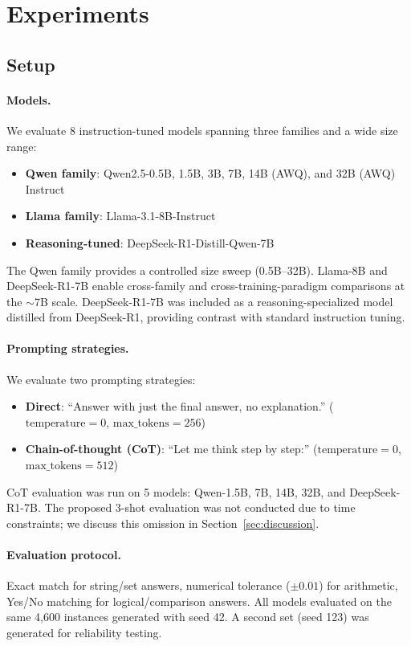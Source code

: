 \documentclass{article}
\begin{document}
\section{Experiments}
\label{sec:experiments}

\subsection{Setup}

\paragraph{Models.} We evaluate 8 instruction-tuned models spanning three families and a wide size range:
\begin{itemize}
    \item \textbf{Qwen family}: Qwen2.5-0.5B, 1.5B, 3B, 7B, 14B (AWQ), and 32B (AWQ) Instruct
    \item \textbf{Llama family}: Llama-3.1-8B-Instruct
    \item \textbf{Reasoning-tuned}: DeepSeek-R1-Distill-Qwen-7B
\end{itemize}
The Qwen family provides a controlled size sweep (0.5B--32B). Llama-8B and DeepSeek-R1-7B enable cross-family and cross-training-paradigm comparisons at the $\sim$7B scale. DeepSeek-R1-7B was included as a reasoning-specialized model distilled from DeepSeek-R1, providing contrast with standard instruction tuning.

\paragraph{Prompting strategies.} We evaluate two prompting strategies:
\begin{itemize}
    \item \textbf{Direct}: ``Answer with just the final answer, no explanation.'' ($\text{temperature}=0$, $\text{max\_tokens}=256$)
    \item \textbf{Chain-of-thought (CoT)}: ``Let me think step by step:'' ($\text{temperature}=0$, $\text{max\_tokens}=512$)
\end{itemize}
CoT evaluation was run on 5 models: Qwen-1.5B, 7B, 14B, 32B, and DeepSeek-R1-7B. The proposed 3-shot evaluation was not conducted due to time constraints; we discuss this omission in Section~\ref{sec:discussion}.

\paragraph{Evaluation protocol.} Exact match for string/set answers, numerical tolerance ($\pm 0.01$) for arithmetic, Yes/No matching for logical/comparison answers. All models evaluated on the same 4{,}600 instances generated with seed 42. A second set (seed 123) was generated for reliability testing.
\end{document}
